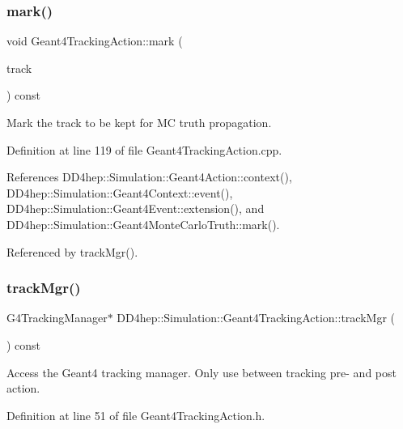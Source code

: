 \subsubsection{\texorpdfstring{mark()}{mark()}}
{\footnotesize\ttfamily void Geant4\+Tracking\+Action\+::mark (\begin{DoxyParamCaption}\item[{const G4\+Track $\ast$}]{track }\end{DoxyParamCaption}) const}



Mark the track to be kept for MC truth propagation. 



Definition at line 119 of file Geant4\+Tracking\+Action.\+cpp.



References D\+D4hep\+::\+Simulation\+::\+Geant4\+Action\+::context(), D\+D4hep\+::\+Simulation\+::\+Geant4\+Context\+::event(), D\+D4hep\+::\+Simulation\+::\+Geant4\+Event\+::extension(), and D\+D4hep\+::\+Simulation\+::\+Geant4\+Monte\+Carlo\+Truth\+::mark().



Referenced by track\+Mgr().

\hypertarget{class_d_d4hep_1_1_simulation_1_1_geant4_tracking_action_ab895bd9c26b30b749fab7a8bdf9351cc}{}\label{class_d_d4hep_1_1_simulation_1_1_geant4_tracking_action_ab895bd9c26b30b749fab7a8bdf9351cc} 
\subsubsection{\texorpdfstring{track\+Mgr()}{trackMgr()}}
{\footnotesize\ttfamily G4\+Tracking\+Manager$\ast$ D\+D4hep\+::\+Simulation\+::\+Geant4\+Tracking\+Action\+::track\+Mgr (\begin{DoxyParamCaption}{ }\end{DoxyParamCaption}) const\hspace{0.3cm}{\ttfamily [inline]}}



Access the Geant4 tracking manager. Only use between tracking pre-\/ and post action. 



Definition at line 51 of file Geant4\+Tracking\+Action.\+h.



